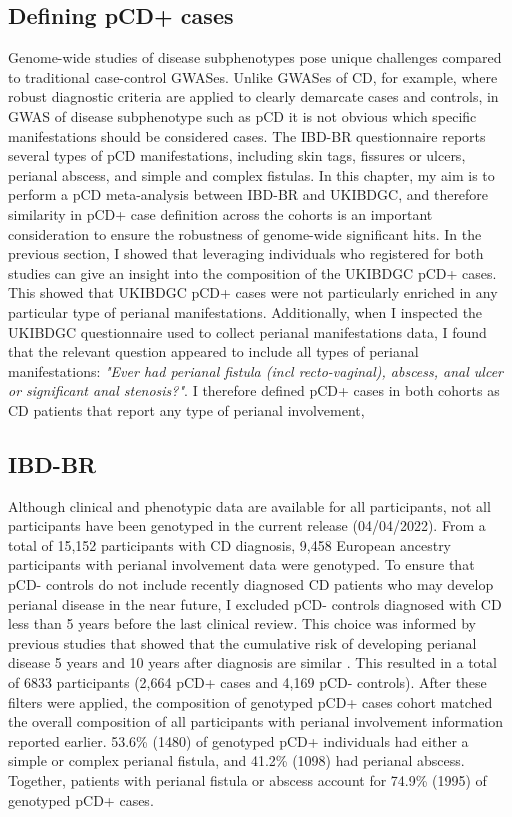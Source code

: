   \subsection{Defining pCD+ cases}
  Genome-wide studies of disease subphenotypes pose unique challenges compared to traditional case-control GWASes. Unlike GWASes of CD, for example, where robust diagnostic criteria are applied to clearly demarcate cases and controls, in GWAS of disease subphenotype such as pCD it is not obvious which specific manifestations should be considered cases. The IBD-BR questionnaire reports several types of pCD manifestations, including skin tags, fissures or ulcers, perianal abscess, and simple and complex fistulas. In this chapter, my aim is to perform a pCD meta-analysis between IBD-BR and UKIBDGC, and therefore similarity in pCD+ case definition across the cohorts is an important consideration to ensure the robustness of genome-wide significant hits. In the previous section, I showed that leveraging individuals who registered for both studies can give an insight into the composition of the UKIBDGC pCD+ cases. This showed that UKIBDGC pCD+ cases were not particularly enriched in any particular type of perianal manifestations. Additionally, when I inspected the UKIBDGC questionnaire used to collect perianal manifestations data, I found that the relevant question appeared to include all types of perianal manifestations: \textit{"Ever had perianal fistula (incl recto-vaginal),  abscess, anal ulcer or significant anal stenosis?"}. I therefore defined pCD+ cases in both cohorts as CD patients that report any type of perianal involvement,
  
 
\subsection{IBD-BR}
Although clinical and phenotypic data are available for all participants, not all participants have been genotyped in the current release (04/04/2022). From a total of 15,152 participants with CD diagnosis, 9,458 European ancestry participants with perianal involvement data were genotyped. To ensure that pCD- controls do not include recently diagnosed CD patients who may develop perianal disease in the near future, I excluded pCD- controls diagnosed with CD less than 5 years before the last clinical review. This choice was informed by previous studies that showed that the cumulative risk of developing perianal disease 5 years and 10 years after diagnosis are similar \cite{Tsai2022-kz}. This resulted in a total of 6833 participants (2,664 pCD+ cases and 4,169 pCD- controls). After these filters were applied, the composition of genotyped pCD+ cases cohort matched the overall composition of all participants with perianal involvement information reported earlier. 53.6\% (1480) of genotyped pCD+ individuals had either a simple or complex perianal fistula, and 41.2\% (1098) had perianal abscess. Together, patients with perianal fistula or abscess account for 74.9\% (1995) of genotyped pCD+ cases.\\

